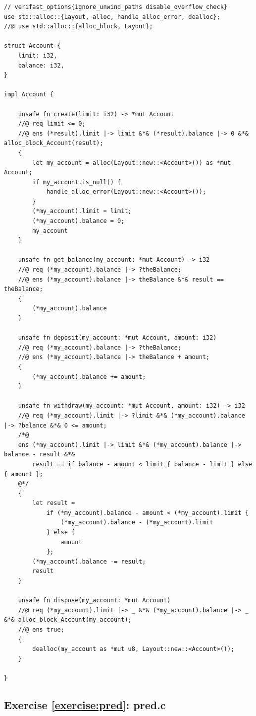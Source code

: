\documentclass{article}
\begin{document}
\begin{lstlisting}
// verifast_options{ignore_unwind_paths disable_overflow_check}
use std::alloc::{Layout, alloc, handle_alloc_error, dealloc};
//@ use std::alloc::{alloc_block, Layout};

struct Account {
    limit: i32,
    balance: i32,
}

impl Account {

    unsafe fn create(limit: i32) -> *mut Account
    //@ req limit <= 0;
    //@ ens (*result).limit |-> limit &*& (*result).balance |-> 0 &*& alloc_block_Account(result);
    {
        let my_account = alloc(Layout::new::<Account>()) as *mut Account;
        if my_account.is_null() {
            handle_alloc_error(Layout::new::<Account>());
        }
        (*my_account).limit = limit;
        (*my_account).balance = 0;
        my_account
    }

    unsafe fn get_balance(my_account: *mut Account) -> i32
    //@ req (*my_account).balance |-> ?theBalance;
    //@ ens (*my_account).balance |-> theBalance &*& result == theBalance;
    {
        (*my_account).balance
    }

    unsafe fn deposit(my_account: *mut Account, amount: i32)
    //@ req (*my_account).balance |-> ?theBalance;
    //@ ens (*my_account).balance |-> theBalance + amount;
    {
        (*my_account).balance += amount;
    }

    unsafe fn withdraw(my_account: *mut Account, amount: i32) -> i32
    //@ req (*my_account).limit |-> ?limit &*& (*my_account).balance |-> ?balance &*& 0 <= amount;
    /*@
    ens (*my_account).limit |-> limit &*& (*my_account).balance |-> balance - result &*&
        result == if balance - amount < limit { balance - limit } else { amount };
    @*/
    {
        let result =
            if (*my_account).balance - amount < (*my_account).limit {
                (*my_account).balance - (*my_account).limit
            } else {
                amount
            };
        (*my_account).balance -= result;
        result
    }

    unsafe fn dispose(my_account: *mut Account)
    //@ req (*my_account).limit |-> _ &*& (*my_account).balance |-> _ &*& alloc_block_Account(my_account);
    //@ ens true;
    {
        dealloc(my_account as *mut u8, Layout::new::<Account>());
    }

}
\end{lstlisting}

\subsection{Exercise \ref{exercise:pred}: pred.c}
\end{document}
